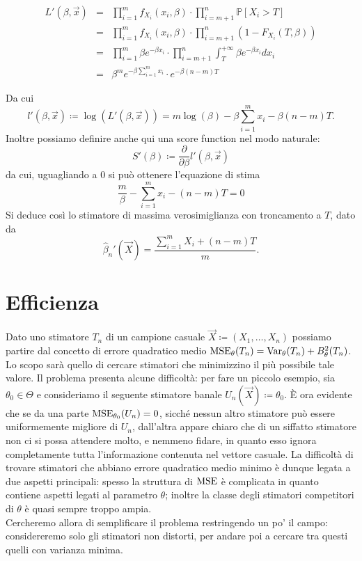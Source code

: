 \begin{enumerate}
\begin{eqnarray*}
L'(\beta,\vec{x}) &=&\prod_{i=1}^m f_{X_i}(x_i,\beta)\cdot\prod_{i=m+1}^n \mathbb{P}[X_i>T] \\
&=& \prod_{i=1}^m f_{X_i}(x_i,\beta)\cdot\prod_{i=m+1}^n \left(1-F_{X_i}(T,\beta)\right) \\
&=& \prod_{i=1}^m \beta e^{-\beta x_i} \cdot\prod_{i=m+1}^n \int_T^{+\infty} \beta e^{-\beta x_i}dx_i \\
&=& \beta^m e^{-\beta \sum_{i=1}^m x_i} \cdot e^{-\beta (n-m)T}
\end{eqnarray*}

Da cui $$l'(\beta,\vec{x})\coloneqq \log\left(L'(\beta,\vec{x})\right)=m\log(\beta)-\beta\sum_{i=1}^m x_i -\beta (n-m)T.$$ 
Inoltre possiamo definire anche qui una score function nel modo naturale: $$S'(\beta)\coloneqq \frac{\partial}{\partial\beta}l'(\beta,\vec{x})$$ da cui, uguagliando a 0 si può ottenere l'equazione di stima $$\frac{m}{\beta}-\sum_{i=1}^m x_i-(n-m)T=0$$ 
Si deduce così lo stimatore di massima verosimiglianza con troncamento a $T$, dato da $$\hat{\beta}_n'(\vec{X})=\frac{\sum_{i=1}^m X_i +(n-m)T}{m}.$$
\end{enumerate}

\section{Efficienza}
Dato uno stimatore $T_n$ di un campione casuale $\vec{X}\coloneqq (X_1,\ldots,X_n)$ possiamo partire dal concetto di errore quadratico medio $\operatorname{MSE}_\theta(T_n)=\operatorname{Var}_\theta(T_n)+B_\theta^2(T_n)$. Lo scopo sarà quello di cercare stimatori che minimizzino il più possibile tale valore. Il problema presenta alcune difficoltà: per fare un piccolo esempio, sia $\theta_0\in \Theta$ e consideriamo il seguente stimatore banale $U_n(\vec{X})\coloneqq \theta_0$. È ora evidente che se da una parte $\operatorname{MSE}_{\theta_0}(U_n)=0$, sicché nessun altro stimatore può essere uniformemente migliore di $U_n$, dall'altra appare chiaro che di un siffatto stimatore non ci si possa attendere molto, e nemmeno fidare, in quanto esso ignora completamente tutta l'informazione contenuta nel vettore casuale. La difficoltà di trovare stimatori che abbiano errore quadratico medio minimo è dunque legata a due aspetti principali: spesso la struttura di $\operatorname{MSE}$ è complicata in quanto contiene aspetti legati al parametro $\theta$; inoltre la classe degli stimatori competitori di $\theta$ è quasi sempre troppo ampia. \\ Cercheremo allora di semplificare il problema restringendo un po' il campo: considereremo solo gli stimatori non distorti, per andare poi a cercare tra questi quelli con varianza minima.  
\\

